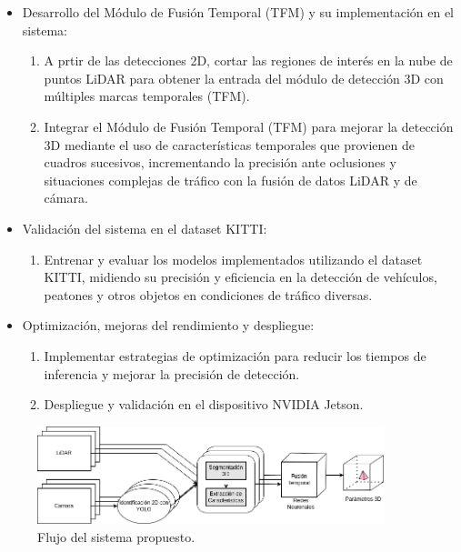 \begin{itemize}
	\item Desarrollo del Módulo de Fusión Temporal (TFM) y su implementación en el sistema:
	\begin{enumerate}
		\item A prtir de las detecciones 2D, cortar las regiones de interés en la nube de puntos LiDAR para obtener la entrada del módulo de detección 3D con múltiples marcas temporales (TFM).
		\item Integrar el Módulo de Fusión Temporal (TFM) \cite{frustum} para mejorar la detección 3D mediante el uso de características temporales que provienen de cuadros sucesivos, incrementando la precisión ante oclusiones y situaciones complejas de tráfico con la fusión de datos LiDAR y de cámara.
	\end{enumerate}
	
	\item Validación del sistema en el dataset KITTI:
	\begin{enumerate}
		\item Entrenar y evaluar los modelos implementados utilizando el dataset KITTI, midiendo su precisión y eficiencia en la detección de vehículos, peatones y otros objetos en condiciones de tráfico diversas.
	\end{enumerate}
	
	\item Optimización, mejoras del rendimiento y despliegue:
	\begin{enumerate}
		\item Implementar estrategias de optimización para reducir los tiempos de inferencia y mejorar la precisión de detección.
		\item Despliegue y validación en el dispositivo NVIDIA Jetson.
	\end{enumerate}
	
\end{itemize}

\begin{figure}[hbtp]
	\centering
	\includegraphics[width=0.9\textwidth]{flujo.png}
	\caption{Flujo del sistema propuesto.}
	\label{fig:flujo_sistema}
\end{figure}



